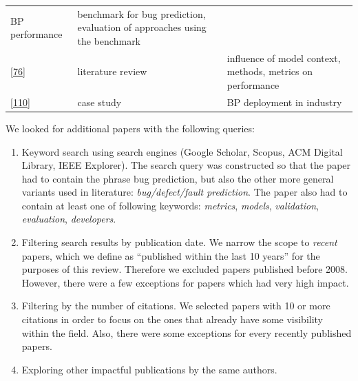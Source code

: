 \documentclass[]{book}
\begin{document}
\begin{longtable}[]{@{}lll@{}}
\begin{minipage}[t]{0.18\columnwidth}
BP performance\strut
\end{minipage} & \begin{minipage}[t]{0.50\columnwidth}\raggedright\strut
benchmark for bug prediction, evaluation of approaches using the
benchmark\strut
\end{minipage}\tabularnewline
\begin{minipage}[t]{0.23\columnwidth}\raggedright\strut
{[}\protect\hyperlink{ref-Hall2012}{76}{]}\strut
\end{minipage} & \begin{minipage}[t]{0.18\columnwidth}\raggedright\strut
literature review\strut
\end{minipage} & \begin{minipage}[t]{0.50\columnwidth}\raggedright\strut
influence of model context, methods, metrics on performance\strut
\end{minipage}\tabularnewline
\begin{minipage}[t]{0.23\columnwidth}\raggedright\strut
{[}\protect\hyperlink{ref-Lewis2013}{110}{]}\strut
\end{minipage} & \begin{minipage}[t]{0.18\columnwidth}\raggedright\strut
case study\strut
\end{minipage} & \begin{minipage}[t]{0.50\columnwidth}\raggedright\strut
BP deployment in industry\strut
\end{minipage}\tabularnewline
\bottomrule
\end{longtable}

We looked for additional papers with the following queries:

\begin{enumerate}
\def\labelenumi{\arabic{enumi}.}
\item
  Keyword search using search engines (Google Scholar, Scopus, ACM
  Digital Library, IEEE Explorer). The search query was constructed so
  that the paper had to contain the phrase bug prediction, but also the
  other more general variants used in literature: \emph{bug/defect/fault
  prediction}. The paper also had to contain at least one of following
  keywords: \emph{metrics}, \emph{models}, \emph{validation},
  \emph{evaluation}, \emph{developers}.
\item
  Filtering search results by publication date. We narrow the scope to
  \emph{recent} papers, which we define as ``published within the last
  10 years'' for the purposes of this review. Therefore we excluded
  papers published before 2008. However, there were a few exceptions for
  papers which had very high impact.
\item
  Filtering by the number of citations. We selected papers with 10 or
  more citations in order to focus on the ones that already have some
  visibility within the field. Also, there were some exceptions for
  every recently published papers.
\item
  Exploring other impactful publications by the same authors.
\end{enumerate}
\end{document}
